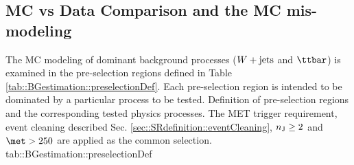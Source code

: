 \subsection{MC vs Data Comparison and the MC mis-modeling} \label{sec::BGestimation::dataMC}
The MC modeling of dominant background processes ($\wjets$ and $\ttbar$) is examined in the pre-selection regions defined in Table \ref{tab::BGestimation::preselectionDef}. 
Each pre-selection region is intended to be dominated by a particular process to be tested. 
%
\tab{c|c|c|c|c|c}{
  \hline
  Region name            & $\nLepbase$ & $\nLepsignal$ & $\lepOnePt$ [GeV]     & $\nBJet$  & Tested processes   \\
  \hline
  \hline
  1LBV  & 1           & 1             & $>35$ & $0$      & $\wjets$           \\
  1LBT  & 1           & 1             & $>35$ & $[1,2]$  & $\ttbar/Wt \,\, (\ra bqq b\ell\nu)$           \\
  2LBT                   & 2           & 2             & -                     & $[1,2]$  & $\ttbar/Wt \,\,  (\ra b\ell\nu b\ell\nu)$           \\ 
  1L3B                   & 1           & 1             & $>15$                 & $\geq 3$ & $\ttbar+cc/bb$, $\ttbarFakeB$ \\
  \hline
}
{Definition of pre-selection regions and the corresponding tested physics processes. The MET trigger requirement, event cleaning described Sec. \ref{sec::SRdefinition::eventCleaning}, $n_{\mathrm{J}} \geq 2$ and $\met>250$ are applied as the common selection.}
{tab::BGestimation::preselectionDef}
%
%

